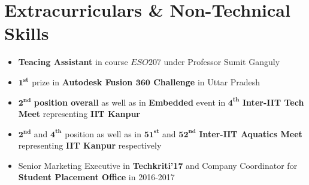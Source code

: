 \documentclass[letterpaper,11pt]{article}
\newcommand{\resumeItemS}[1]{
  \item\small{
    {#1 \vspace{-4pt}}
  }
}
\newcommand{\resumeSubItemS}[1]{\resumeItemS{#1}\vspace{-0.8pt}}
\newcommand{\resumeSubHeadingListStart}{\begin{itemize}[leftmargin=*]}
\newcommand{\resumeSubHeadingListEnd}{\end{itemize}}
\begin{document}
\section{Extracurriculars \& Non-Technical Skills}
  \resumeSubHeadingListStart
    \resumeSubItemS
      {\textbf{Teacing Assistant} in course $ESO207$ under Professor Sumit Ganguly}
    \resumeSubItemS
      {$\bm{1^{st}}$ prize in \textbf{Autodesk Fusion $\textbf{360}$ Challenge} in Uttar Pradesh}
    \resumeSubItemS
      {$\bm{2^{nd}}$ \textbf{position overall} as well as in \textbf{Embedded} event in $\bm{4^{th}}$ \textbf{Inter-IIT Tech Meet} representing \textbf{IIT Kanpur}}
    \resumeSubItemS
      {$\bm{2^{nd}}$ and $\bm{4^{th}}$ position as well as in $\bm{51^{st}}$ and $\bm{52^{nd}}$ \textbf{Inter-IIT Aquatics Meet} representing \textbf{IIT Kanpur} respectively}
    \resumeSubItemS
      {Senior Marketing Executive in \textbf{Techkriti'17} and Company Coordinator for \textbf{Student Placement Office} in 2016-2017}
  \resumeSubHeadingListEnd
\end{document}
